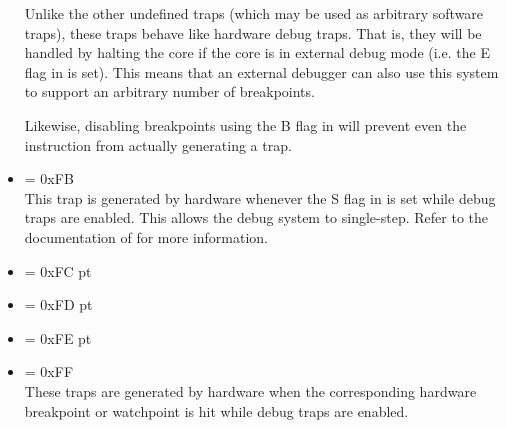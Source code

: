 \begin{itemize}
Unlike the other undefined traps (which may be used as arbitrary software
traps), these traps behave like hardware debug traps. That is, they will be
handled by halting the core if the core is in external debug mode (i.e. the E
flag in  is set). This means that an external debugger can also use
this system to support an arbitrary number of breakpoints.

Likewise, disabling breakpoints using the B flag in  will prevent even
the  instruction from actually generating a trap.

\setcounter{enumi}{250}
\item {} \label{trap:STEP_COMPLETE}  = 0xFB
\\[6 pt]
This trap is generated by hardware whenever the S flag in  is set
while debug traps are enabled. This allows the debug system to single-step.
Refer to the documentation of  for more information.

\setcounter{enumi}{251}
\item {} \label{trap:HW_BREAKPOINT_0}  = 0xFC
 pt\relax
\item {} \label{trap:HW_BREAKPOINT_1}  = 0xFD
 pt\relax
\item {} \label{trap:HW_BREAKPOINT_2}  = 0xFE
 pt\relax
\item {} \label{trap:HW_BREAKPOINT_3}  = 0xFF
\\[6 pt]
These traps are generated by hardware when the corresponding hardware breakpoint
or watchpoint is hit while debug traps are enabled.

\end{itemize}
